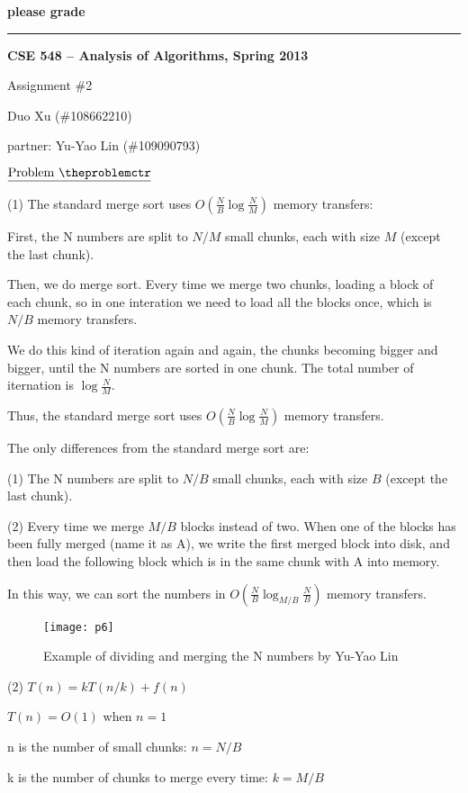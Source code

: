 \documentclass[11pt]{article}
\def\pp{\par\noindent}
\begin{document}
\centerline{\bf please grade}
\medskip
\hrule
\bigskip
\centerline{\bf CSE 548 -- Analysis of Algorithms, Spring 2013}
\medskip
\centerline{Assignment \#2}
\medskip
\centerline{Duo Xu (\#108662210)}
\medskip
\centerline{partner: Yu-Yao Lin (\#109090793)}
\bigskip
\bigskip


\addtocounter{problemctr}{6}
\bigskip
\noindent
$\underline{\rm Problem\ \theproblemctr}$\pp
\noindent
(1) The standard merge sort uses $O(\frac{N}{B}\log\frac{N}{M})$ memory transfers:

First, the N numbers are split to $N/M$ small chunks, each with size $M$ (except the last chunk).

Then, we do merge sort. Every time we merge two chunks, loading a block of each chunk, so in one interation we need to load all the blocks once, which is $N/B$ memory transfers.

We do this kind of iteration again and again, the chunks becoming bigger and bigger, until the N numbers are sorted in one chunk. The total number of iternation is $\log\frac{N}{M}$.

Thus, the standard merge sort uses $O(\frac{N}{B}\log\frac{N}{M})$ memory transfers.

\bigskip

The only differences from the standard merge sort are:

(1) The N numbers are split to $N/B$ small chunks, each with size $B$ (except the last chunk).

(2) Every time we merge $M/B$ blocks instead of two. When one of the blocks has been fully merged (name it as A), we write the first merged block into disk, and then load the following block which is in the same chunk with A into memory. 

In this way, we can sort the numbers in $O(\frac{N}{B}\log_{M/B} \frac{N}{B})$ memory transfers.

\begin{figure} [htpb]
\centering
\texttt{[image: p6]}
\caption{Example of dividing and merging the N numbers by Yu-Yao Lin}
\label{fig:merge sort}
\end{figure}

\bigskip
\bigskip
\noindent
(2) $T(n)=kT(n/k)+f(n)$

$T(n)=O(1)$  when $n=1$

n is the number of small chunks: $n=N/B$

k is the number of chunks to merge every time: $k=M/B$
\end{document}
